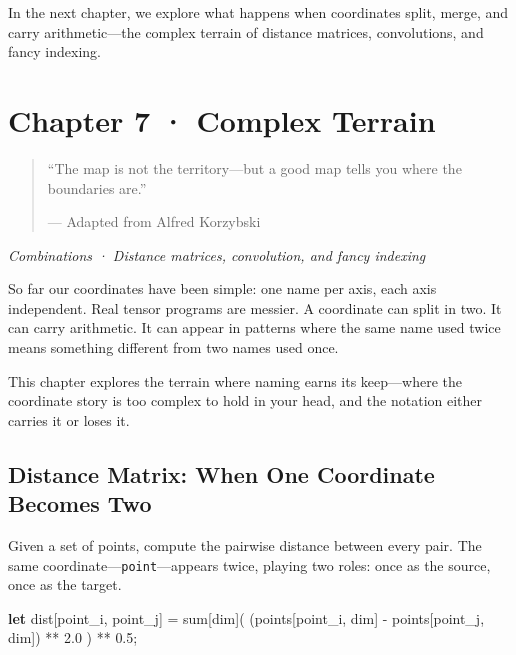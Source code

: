 \documentclass[11pt,titlepage]{article}
\newenvironment{Shaded}{}{}
\newcommand{\DecValTok}[1]{\textcolor[rgb]{0.25,0.63,0.44}{#1}}
\newcommand{\KeywordTok}[1]{\textcolor[rgb]{0.00,0.44,0.13}{\textbf{#1}}}
\newcommand{\NormalTok}[1]{#1}
\newcommand{\OperatorTok}[1]{\textcolor[rgb]{0.40,0.40,0.40}{#1}}
\begin{document}
In the next chapter, we explore what happens when coordinates split,
merge, and carry arithmetic---the complex terrain of distance matrices,
convolutions, and fancy indexing.

\newpage

\hypertarget{chapter-7-complex-terrain}{%
\section{Chapter 7 · Complex Terrain}\label{chapter-7-complex-terrain}}

\begin{quote}
``The map is not the territory---but a good map tells you where the
boundaries are.''

--- Adapted from Alfred Korzybski
\end{quote}

\emph{Combinations · Distance matrices, convolution, and fancy indexing}

\vspace{2em}

So far our coordinates have been simple: one name per axis, each axis
independent. Real tensor programs are messier. A coordinate can split in
two. It can carry arithmetic. It can appear in patterns where the same
name used twice means something different from two names used once.

This chapter explores the terrain where naming earns its keep---where
the coordinate story is too complex to hold in your head, and the
notation either carries it or loses it.

\vspace{2em}

\hypertarget{distance-matrix-when-one-coordinate-becomes-two}{%
\subsection{Distance Matrix: When One Coordinate Becomes
Two}\label{distance-matrix-when-one-coordinate-becomes-two}}

Given a set of points, compute the pairwise distance between every pair.
The same coordinate---\texttt{point}---appears twice, playing two roles:
once as the source, once as the target.

\begin{Shaded}
\begin{Highlighting}[]
\KeywordTok{let}\NormalTok{ dist}\OperatorTok{[}\NormalTok{point_i, point_j}\OperatorTok{]}\NormalTok{ =}
\NormalTok{    sum}\OperatorTok{[}\NormalTok{dim}\OperatorTok{]}\NormalTok{( (points}\OperatorTok{[}\NormalTok{point_i, dim}\OperatorTok{]}\NormalTok{ - points}\OperatorTok{[}\NormalTok{point_j, dim}\OperatorTok{]}\NormalTok{) ** }\DecValTok{2.0}\NormalTok{ ) ** }\DecValTok{0.5}\NormalTok{;}
\end{Highlighting}
\end{Shaded}
\end{document}
